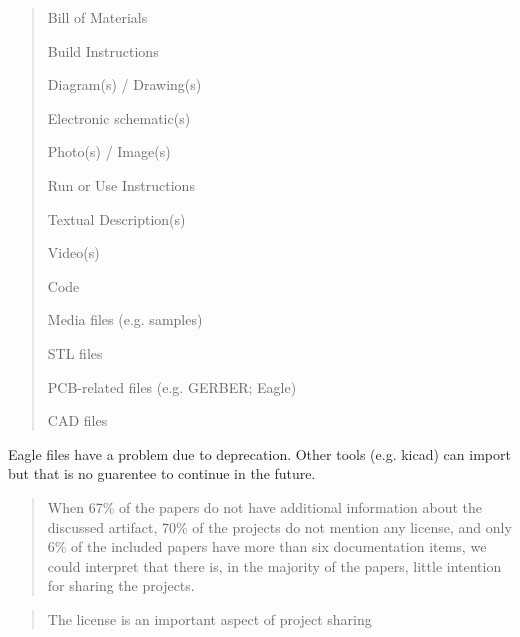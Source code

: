 \begin{quotation}
\item Bill of Materials
\item Build Instructions
\item Diagram(s) / Drawing(s)
\item Electronic schematic(s)
\item Photo(s) / Image(s)
\item Run or Use Instructions
\item Textual Description(s)
\item Video(s)
\item Code
\item Media files (e.g. samples)
\item STL files
\item PCB-related files (e.g. GERBER; Eagle)
\item CAD files
\end{quotation}

Eagle files have a problem due to deprecation. Other tools (e.g. kicad) can
import but that is no guarentee to continue in the future.

\begin{quotation}
When 67\% of the papers do not have additional information about the discussed
artifact, 70\% of the projects do not mention any license, and only 6\% of the
included papers have more than six documentation items, we could interpret that
there is, in the majority of the papers, little intention for sharing the
projects.
\end{quotation}


\begin{quotation}
The license is an important aspect of project sharing \cite{colazo_licence_2009}
\end{quotation}

